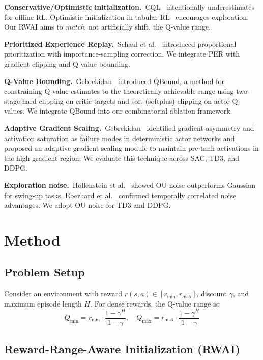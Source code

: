 \documentclass[11pt,a4paper]{article}
\begin{document}
\textbf{Conservative/Optimistic initialization.}~CQL~\citep{kumar2020cql} intentionally underestimates for offline RL. Optimistic initialization in tabular RL~\citep{sutton2018rl} encourages exploration. Our RWAI aims to \emph{match}, not artificially shift, the Q-value range.

\textbf{Prioritized Experience Replay.}~Schaul et al.~\citep{schaul2016per} introduced proportional prioritization with importance-sampling correction. We integrate PER with gradient clipping and Q-value bounding.

\textbf{Q-Value Bounding.}~Gebrekidan~\citep{gebrekidan2025qbound} introduced QBound, a method for constraining Q-value estimates to the theoretically achievable range using two-stage hard clipping on critic targets and soft (softplus) clipping on actor Q-values. We integrate QBound into our combinatorial ablation framework.

\textbf{Adaptive Gradient Scaling.}~Gebrekidan~\citep{gebrekidan2025as} identified gradient asymmetry and activation saturation as failure modes in deterministic actor networks and proposed an adaptive gradient scaling module to maintain pre-tanh activations in the high-gradient region. We evaluate this technique across SAC, TD3, and DDPG.

\textbf{Exploration noise.}~Hollenstein et al.~\citep{hollenstein2022noise} showed OU noise outperforms Gaussian for swing-up tasks. Eberhard et al.~\citep{eberhard2023pink} confirmed temporally correlated noise advantages. We adopt OU noise for TD3 and DDPG.

\section{Method}

\subsection{Problem Setup}

Consider an environment with reward $r(s,a) \in [r_{\min}, r_{\max}]$, discount $\gamma$, and maximum episode length $H$. For dense rewards, the Q-value range is:
\begin{equation}
Q_{\min} = r_{\min} \cdot \frac{1-\gamma^H}{1-\gamma}, \quad Q_{\max} = r_{\max} \cdot \frac{1-\gamma^H}{1-\gamma}
\end{equation}

\subsection{Reward-Range-Aware Initialization (RWAI)}
\end{document}
